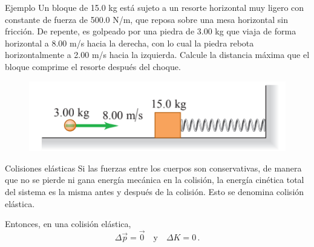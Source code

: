 \begin{frame}{Ejemplo}
    Un bloque de 15.0 kg está sujeto a un resorte horizontal muy ligero con constante de fuerza de 500.0 N/m, que reposa sobre una mesa horizontal sin fricción. De repente, es golpeado por una piedra de 3.00 kg que viaja de forma horizontal a 8.00 m/s hacia la derecha, con lo cual la piedra rebota horizontalmente a 2.00 m/s hacia la izquierda. Calcule la distancia máxima que el bloque comprime el resorte después del choque.

    \begin{figure}
        \centering
        \includegraphics[width=0.5\linewidth]{figures/leyes-conserv.png}
    \end{figure}
\end{frame}

\begin{frame}{Colisiones elásticas}
    Si las fuerzas entre los cuerpos son conservativas, de manera que no se pierde ni gana energía mecánica en la colisión, la energía cinética total del sistema es la misma antes y después de la colisión. Esto se denomina colisión elástica.

    \vspace{1em} Entonces, en una colisión elástica, \begin{equation*}
        \Delta\vec{p}=\vec{0}\quad\text{y}\quad\Delta K = 0\,.
    \end{equation*}
\end{frame}

